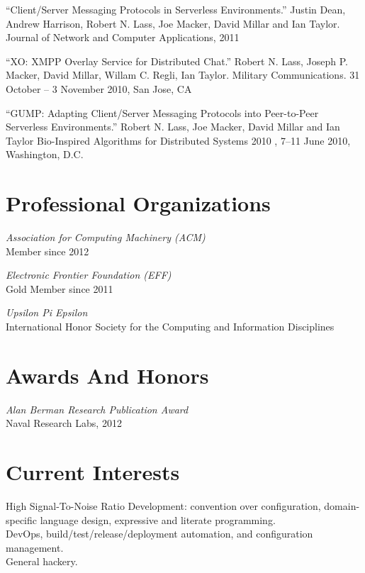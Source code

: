\documentclass[margin]{res}
\begin{document}
\begin{resume}
  ``Client/Server Messaging Protocols in Serverless Environments.'' Justin Dean, Andrew Harrison, Robert N. Lass, Joe Macker, David Millar and Ian Taylor. Journal of Network and Computer Applications, 2011

  ``XO: XMPP Overlay Service for Distributed Chat.'' Robert N. Lass, Joseph P. Macker, David Millar, Willam C. Regli, Ian Taylor. Military Communications. 31 October -- 3 November 2010, San Jose, CA

  ``GUMP: Adapting Client/Server Messaging Protocols into Peer-to-Peer Serverless Environments.'' Robert N. Lass, Joe Macker, David Millar and Ian Taylor Bio-Inspired Algorithms for Distributed Systems 2010 , 7--11 June 2010, Washington, D.C.


\section{Professional Organizations}
  {\it Association for Computing Machinery (ACM)} \\
  Member since 2012

  {\it Electronic Frontier Foundation (EFF)} \\
  Gold Member since 2011

  {\it Upsilon Pi Epsilon} \\
  International Honor Society for the Computing and Information Disciplines

\section{Awards And Honors}
  {\it Alan Berman Research Publication Award} \\
  Naval Research Labs, 2012

\section{Current Interests}
  High Signal-To-Noise Ratio Development: convention over configuration, domain-specific language design, expressive and literate programming. \\
  DevOps, build/test/release/deployment automation, and configuration management. \\
  General hackery.

\end{resume}
\end{document}
